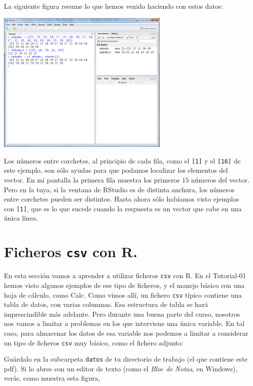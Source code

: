 \documentclass[10pt,a4paper]{article}\usepackage[]{graphicx}\usepackage[]{color}
\newcounter {cont01}
\begin{document}
La siguiente figura resume lo que hemos venido haciendo con estos datos:
    \begin{center}
    \includegraphics[height=7cm]{../fig/Tut02-05.png}
    \end{center}
Los números entre corchetes, al principio de cada fila, como el {\tt [1]} y el {\tt [16]} de este ejemplo, son sólo ayudas para que podamos localizar los elementos del vector. En mi pantalla la primera fila muestra los primeros $15$ números del vector. Pero en la tuya, si la ventana de RStudio es de distinta anchura, los números entre corchetes pueden ser distintos. Hasta ahora sólo habíamos visto ejemplos con {\tt [1]}, que es lo que sucede cuando la respuesta es un vector que cabe en una única línea.



\section{Ficheros {\tt csv} con R.}
\label{tut03:sec:FicherosCsvEnR}

En esta sección vamos a aprender a utilizar ficheros {\tt csv} con R. En el Tutorial-01 hemos visto algunos ejemplos de ese tipo de ficheros, y el manejo básico con una hoja de cálculo, como Calc. Como vimos allí, un fichero {\tt csv} típico contiene una tabla de datos, con varias columnas. Esa estructura de tabla se hará imprescindible más adelante. Pero durante una buena parte del curso, nosotros nos vamos a limitar a problemas en los que interviene una única variable. En tal caso, para almacenar los datos de esa variable nos podemos a limitar a considerar un tipo de ficheros {\tt csv} muy básico, como el fichero adjunto:
\begin{center}
\end{center}
Guárdalo en la subcarpeta {\tt datos} de tu directorio de trabajo (el que contiene este pdf). Si lo abres con un editor de texto (como el {\em Bloc de Notas}, en Windows), verás, como muestra esta figura,
\end{document}
